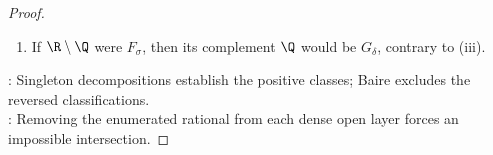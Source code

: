 \begin{corollary}
\begin{proof}
\begin{enumerate}[label=(\roman*)]
\begin{enumerate}[label=(\alph*)]
\item {}: Therefore $(H_n)$ is a sequence of dense open subsets of $\R$.\\
Choose $x\in\bigcap\limits_{n=1}^{\infty}H_n$ by Theorem \ref{thm:dense-open-baire-real-line}. Since $(\forall n\in\N)\,H_n\subseteq G_n$, one has $x\in\bigcap\limits_{n=1}^{\infty}G_n=\Q$.\\
Choose $k\in\N$, $x=q_k$ by $\Q=\{q_1,q_2,\ldots\}$. Then $x\notin H_k$, whereas $x\in H_k$ by choice of $x$, contradiction.
\end{enumerate}
\item If $\R\setminus\Q$ were $F_\sigma$, then its complement $\Q$ would be $G_\delta$, contrary to (iii).
\end{enumerate}
: Singleton decompositions establish the positive classes; Baire excludes the reversed classifications.\\
: Removing the enumerated rational from each dense open layer forces an impossible intersection.
\end{proof}
\end{corollary}

